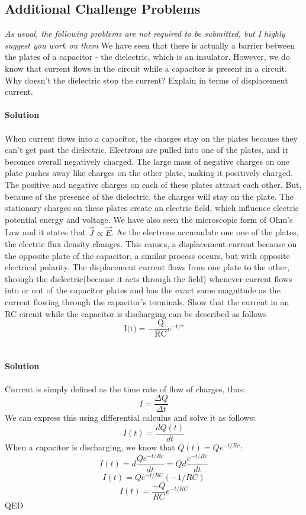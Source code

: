 \documentclass[9pt,addpoints]{exam}
\begin{document}
\begin{questions}
		\subsection*{Additional Challenge Problems}
		\textit{As usual, the following problems are not required to be submitted, but I highly suggest you work on them} 
		\question We have seen that there is actually a barrier between the plates of a capacitor - the dielectric, which is an insulator. However, we do know that current flows in the circuit while a capacitor is present in a circuit. Why doesn't the dielectric stop the current? Explain in terms of displacement current. \\ \\
		\textbf{Solution} \\ \\
		When current flows into a capacitor, the charges stay on the plates because they can't get past the dielectric. Electrons are pulled into one of the plates, and it becomes overall negatively charged. The large mass of negative charges on one plate pushes away like charges on the other plate, making it positively charged. The positive and negative charges on each of these plates attract each other. But, because of the presence of the dielectric, the charges will stay on the plate. The stationary charges on these plates create an electric field, which influence electric potential energy and voltage. We have also seen the microscopic form of Ohm's Law and it states that $\vec{J}\propto\vec{E}$. As the electrons accumulate one one of the plates, the electric flux density changes. This causes, a displacement current because on the opposite plate of the capacitor, a similar process occurs, but with opposite electrical polarity. The displacement current flows from one plate to the other, through the dielectric(because it acts through the field) whenever current flows into or out of the capacitor plates and has the exact same magnitude as the current flowing through the capacitor's terminals.
		\question Show that the current in an RC circuit while the capacitor is discharging can be described as follows 
		$$\text{I(t)} = - \frac{\text{Q}}{\text{RC}}e^{-\text{t}/\tau}$$\\ \\
		\textbf{Solution} \\ \\
		Current is simply defined as the time rate of flow of charges, thus:
		$$I=\dfrac{\Delta Q}{\Delta t}$$
		We can express this using differential calculus and solve it as follows:
		$$I(t)=\dfrac{dQ(t)}{dt}$$
		When a capacitor is discharging, we know that $Q(t)=Qe^{-t/Rc}$:
		$$I(t)=d\dfrac{Qe^{-t/Rc}}{dt}=Q d\dfrac{e^{-t/Rc}}{dt}$$
		$$I(t)=Qe^{-t/RC}(-1/RC)$$
		$$I(t)=\dfrac{-Q}{RC}e^{-t/RC}$$
		QED
	\end{questions}		
\end{document}
